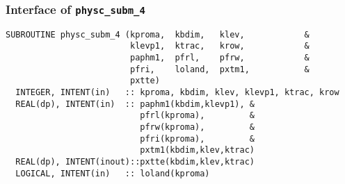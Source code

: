 \subsubsection{Interface of {\tt physc\_subm\_4}}

\begin{lstlisting}[caption=physc\_subm\_4]
SUBROUTINE physc_subm_4 (kproma,  kbdim,   klev,            &
                         klevp1,  ktrac,   krow,            &
                         paphm1,  pfrl,    pfrw,            &
                         pfri,    loland,  pxtm1,           &
                         pxtte)
  INTEGER, INTENT(in)   :: kproma, kbdim, klev, klevp1, ktrac, krow
  REAL(dp), INTENT(in)  :: paphm1(kbdim,klevp1), &
                           pfrl(kproma),         &
                           pfrw(kproma),         &
                           pfri(kproma),         &
                           pxtm1(kbdim,klev,ktrac)
  REAL(dp), INTENT(inout)::pxtte(kbdim,klev,ktrac)
  LOGICAL, INTENT(in)   :: loland(kproma)         
\end{lstlisting}

